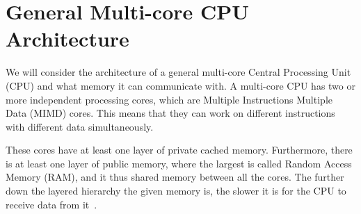 \section{General Multi-core CPU Architecture}
\label{sec:cpu}

We will consider the architecture of a general multi-core Central Processing Unit (CPU) and what memory it can communicate with.
A multi-core CPU has two or more independent processing cores, which are Multiple Instructions Multiple Data (MIMD) cores.
This means that they can work on different instructions with different data simultaneously.

These cores have at least one layer of private cached memory.
Furthermore, there is at least one layer of public memory, where the largest is called Random Access Memory (RAM), and it thus shared memory between all the cores.
The further down the layered hierarchy the given memory is, the slower it is for the CPU to receive data from it~\cite{bryant2003computer}.
